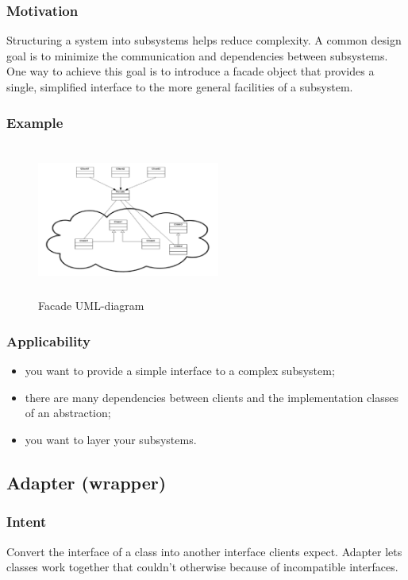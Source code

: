 \documentclass[10pt,xcolor={usenames,dvipsnames}]{beamer}
\begin{document}
\begin{frame}[fragile]
	\frametitle{Motivation}
	\begin{exampleblock}{}
Structuring a system into subsystems helps reduce complexity. A common design goal is to minimize the communication and dependencies between subsystems. One way to achieve this goal is to introduce a facade object that provides a single, simplified interface to the more general facilities of a subsystem.
	\end{exampleblock}
\end{frame}

\begin{frame}[fragile]
	\frametitle{Example}
		\begin{figure}
			\includegraphics[height=5cm,width=6cm]{facade.png}
			\caption{Facade UML-diagram}
		\end{figure}
\end{frame}

\begin{frame}[fragile]
	\frametitle{Applicability}
	\begin{exampleblock}{}
		\begin{itemize}
			\item you want to provide a simple interface to a complex subsystem;
			\item there are many dependencies between clients and the implementation classes
of an abstraction;
			\item you want to layer your subsystems.
		\end{itemize}
	\end{exampleblock}
\end{frame}

\subsection{Adapter (wrapper)}
\begin{frame}[fragile]
	\frametitle{Intent}
	\begin{exampleblock}{}
	Convert the interface of a class into another interface clients expect. Adapter lets
	classes work together that couldn't otherwise because of incompatible interfaces.
	\end{exampleblock}
\end{frame}
\end{document}
